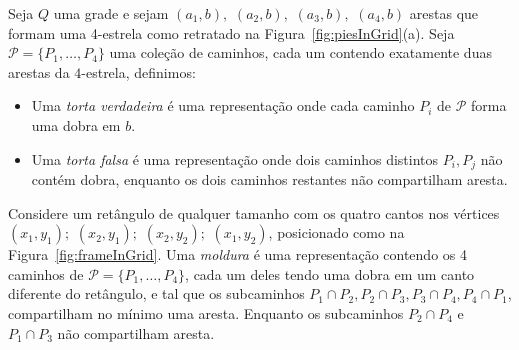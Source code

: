 
\begin{definition} \label{defi:tortasFrame}

Seja $ Q $ uma grade e sejam $ (a_1, b),$ $(a_2, b),$ $(a_3, b),$ $(a_4, b)$ arestas que formam uma 4-estrela como retratado na Figura~\ref{fig:piesInGrid}(a). Seja  $ \mathcal{P} = \{P_1, \dots , P_4\}$ uma coleção de caminhos, cada um contendo exatamente duas arestas da $4$-estrela, definimos:

\begin{itemize}
\item Uma \emph{torta verdadeira} é uma representação onde cada caminho $P_i$ de $ \mathcal{P} $ forma uma dobra em $b$.

\item Uma \emph {torta falsa} é uma representação onde dois caminhos distintos $P_i, P_j$  não contém dobra, enquanto os dois caminhos restantes não compartilham aresta. 


%


\end{itemize}
\end{definition}

\begin{definition} \label{defi:tortasFrame2}
 Considere um retângulo de qualquer tamanho com os quatro cantos nos vértices  $ (x_1, y_1);$ $(x_2, y_1);$ $(x_2, y_2);$ $(x_1, y_2)$, posicionado como na Figura~\ref{fig:frameInGrid}. Uma \emph{moldura} é uma representação contendo os 4 caminhos de $\mathcal{P} =  \{ P_1, \dots, P_4\} $, cada um deles tendo uma dobra em um canto diferente do retângulo, e tal que os subcaminhos $ P_1 \cap P_2, P_2 \cap P_3, P_3 \cap P_4, P_4 \cap P_1 $, compartilham no mínimo uma aresta. Enquanto os subcaminhos  $ P_2 \cap P_4 $ e $ P_1 \cap P_3 $ não compartilham aresta.


\end{definition}


%


